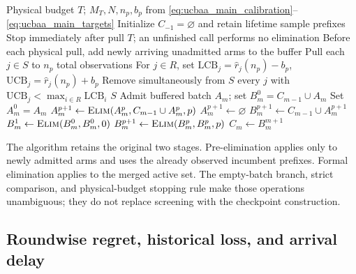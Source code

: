 \documentclass[11pt]{article}
\begin{document}
\begin{algorithm}[t]
\caption{UCB for Arriving Arms (UCB-AA), with explicit prefix comparisons}
\label{alg:ucb-aa}
\small
\begin{algorithmic}[1]
\Require Physical budget $T$; $M_T,N,n_p,b_p$ from
\eqref{eq:ucbaa_main_calibration}--\eqref{eq:ucbaa_main_targets}
\State Initialize $C_{-1}=\varnothing$ and retain lifetime sample prefixes
\State Stop immediately after pull $T$; an unfinished call performs no elimination
    \State Before each physical pull, add newly arriving unadmitted arms to the buffer
    \State Pull each $j\in S$ to $n_p$ total observations
    \State For $j\in R$, set $\mathrm{LCB}_j=\hat r_j(n_p)-b_p$,
           $\mathrm{UCB}_j=\hat r_j(n_p)+b_p$
    \State Remove simultaneously from $S$ every $j$ with
           $\mathrm{UCB}_j<\max_{i\in R}\mathrm{LCB}_i$
    \State \Return $S$
\EndProcedure
{}
    \State Admit buffered batch $A_m$; set $B_m^0=C_{m-1}\cup A_m$
        \State Set $A_m^0=A_m$
                \State $A_m^{p+1}\gets\Call{Elim}{A_m^p,C_{m-1}\cup A_m^p,p}$
            \Else
                \State $A_m^{p+1}\gets\varnothing$
            \EndIf
            \State $B_m^{p+1}\gets C_{m-1}\cup A_m^{p+1}$
        \EndFor
    \EndIf
        \State $B_m^1\gets\Call{Elim}{B_m^0,B_m^0,0}$
    \Else
            \State $B_m^{p+1}\gets\Call{Elim}{B_m^p,B_m^p,p}$
        \EndFor
    \EndIf
    \State $C_m\gets B_m^{m+1}$
\EndFor
\end{algorithmic}
\end{algorithm}

The algorithm retains the original two stages. Pre-elimination applies only
to newly admitted arms and uses the already observed incumbent prefixes.
Formal elimination applies to the merged active set. The empty-batch branch,
strict comparison, and physical-budget stopping rule make those operations
unambiguous; they do not replace screening with the checkpoint construction.

\subsection{Roundwise regret, historical loss, and arrival delay}
\label{sec:ucbaa_three_contributions}
\end{document}
